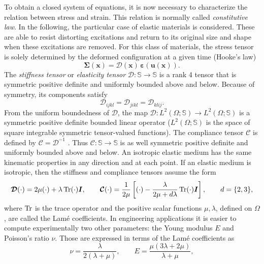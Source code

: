 To obtain a closed system of equations, it is now necessary to characterize the relation between stress and strain. This relation is normally called \textit{constitutive law}. In the following, the particular case of elastic materials is considered. These are able to resist distorting excitations and return to its original size and shape when these excitations are removed. For this class of materials, the stress tensor is solely determined by the deformed configuration at a given time (Hooke's law)
\begin{equation*}
\bm{\Sigma}(\bm{x}) = \bm{\mathcal{D}}(\bm{x}) \, \bm{\varepsilon}(\bm{u}(\bm{x})).
\end{equation*}
The \textit{stiffness tensor} or \textit{elasticity tensor} $\bm{\mathcal{D}} : \mathbb{S} \rightarrow \mathbb{S}$ is a rank 4 tensor that is symmetric positive definite and uniformly bounded above and below. Because of symmetry, its components satisfy
\begin{equation*}
\mathcal{D}_{ijkl} = \mathcal{D}_{jikl} = \mathcal{D}_{klij}.
\end{equation*}
From the uniform boundedness of $\bm{\mathcal{D}}$, the map
$\bm{\mathcal{D}}: L^2 (\Omega; \mathbb{S}) \rightarrow L^2 (\Omega; \mathbb{S})$ is a symmetric positive definite bounded linear operator ($L^2 (\Omega; \mathbb{S})$ is the space of square integrable symmetric tensor-valued functions). The compliance tensor $\bm{\mathcal{C}}$ is defined by $\bm{\mathcal{C}} = \bm{\mathcal{D}}^{-1}$ . Thus $\bm{\mathcal{C}} : \mathbb{S} \rightarrow \mathbb{S}$ is as well symmetric positive definite and uniformly bounded above and below. An isotropic
elastic medium has the same kinematic properties in any direction and at each point. If an elastic medium is isotropic, then the stiffness and compliance tensors assume the form
\begin{equation}
\bm{\mathcal{D}}(\cdot) = 2\mu (\cdot) + \lambda \operatorname{Tr}(\cdot)\bm{I}, \qquad \bm{\mathcal{C}}(\cdot) = \frac{1}{2\mu}\left[(\cdot) - \frac{\lambda}{2\mu + d\lambda}\operatorname{Tr}(\cdot)\bm{I}\right], \qquad d= \{2,3\},
\end{equation}
where  $\operatorname{Tr}$ is the trace operator and the positive scalar functions $\mu, \lambda$, defined on $\Omega$, are called the Lam\'e coefficients. In engineering applications it is easier to compute experimentally two other parameters: the Young modulus $E$ and  Poisson's ratio $\nu$. Those are expressed in terms of the Lam\'e  coefficients as 
\begin{equation}
\nu =\frac{\lambda}{2(\lambda +\mu)}, \qquad 
E=\frac{\mu (3\lambda +2\mu)}{\lambda +\mu},
\end{equation}
